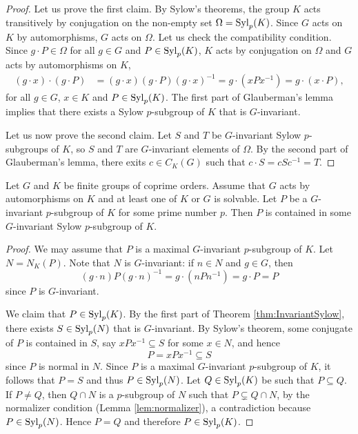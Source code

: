 \begin{proof}
	Let us prove the first claim. By Sylow's theorems, the group $K$ acts transitively by conjugation
	on the non-empty set 
	$\Omega=\mathrm{Syl}_p(K)$. Since $G$ acts on $K$ by automorphisms, $G$ acts on $\Omega$. Let us check the
	compatibility condition. Since $g\cdot P\in\Omega$ for all $g\in G$ and $P\in \mathrm{Syl}_p(K)$, $K$ acts by conjugation
	on $\Omega$ and $G$ acts by automorphisms on $K$, 
	\begin{align*}
	(g\cdot x)\cdot (g\cdot P) &= (g\cdot x)(g\cdot P)(g\cdot x)^{-1}
	=g\cdot (xPx^{-1})=g\cdot (x\cdot P),
	\end{align*}
	for all $g\in G$, $x\in K$ and $P\in\mathrm{Syl}_p(K)$.
	The first part of Glauberman's lemma implies that there exists a Sylow $p$-subgroup 
	of $K$ that is $G$-invariant. 
	
	Let us now prove the second claim. 
	Let $S$ and $T$ be $G$-invariant Sylow $p$-subgroups of $K$, so $S$ and $T$ are $G$-invariant elements of $\Omega$. 
	By the second part of Glauberman's lemma, 
	there exits $c\in C_K(G)$ such that $c\cdot S=cSc^{-1}=T$. 
\end{proof}

\begin{corollary}
	 Let $G$ and $K$ be finite groups of coprime orders. Assume that $G$ acts by automorphisms on $K$ and 
	at least one of $K$ or $G$ is solvable. Let $P$ be a $G$-invariant $p$-subgroup 
	of $K$ for some prime number $p$. Then $P$ is contained in some $G$-invariant Sylow $p$-subgroup of $K$.  
\end{corollary}

\begin{proof}
	We may assume that $P$ is a maximal $G$-invariant $p$-subgroup of $K$. Let $N=N_K(P)$. Note that $N$ is $G$-invariant: if $n\in N$ and $g\in G$, then
	\[
	(g\cdot n)P(g\cdot n)^{-1}=g\cdot (nPn^{-1})=g\cdot P=P
	\]	
	since $P$ is $G$-invariant. 
	
	We claim that $P\in\mathrm{Syl}_p(K)$. By the first part of Theorem \ref{thm:InvariantSylow}, there exists 
	$S\in\mathrm{Syl}_p(N)$ that is $G$-invariant. By Sylow's theorem, 
	some conjugate of $P$ is contained in $S$, say $xPx^{-1}\subseteq S$ for some $x\in N$, and hence
	\[
	P=xPx^{-1}\subseteq S
	\]
	since $P$ is normal in $N$. Since $P$ is a maximal $G$-invariant $p$-subgroup of $K$, it follows that $P=S$ 
	and thus $P\in\mathrm{Syl}_p(N)$.   
	Let $Q\in\mathrm{Syl}_p(K)$ be such that $P\subseteq Q$. If $P\ne Q$, then   
	$Q\cap N$ is a  $p$-subgroup of $N$ such that $P\subsetneq Q\cap N$,  by the normalizer condition (Lemma \ref{lem:normalizer}), a contradiction because $P\in\mathrm{Syl}_p(N)$. 
	Hence $P=Q$ and therefore
	$P\in\mathrm{Syl}_p(K)$.
\end{proof}

